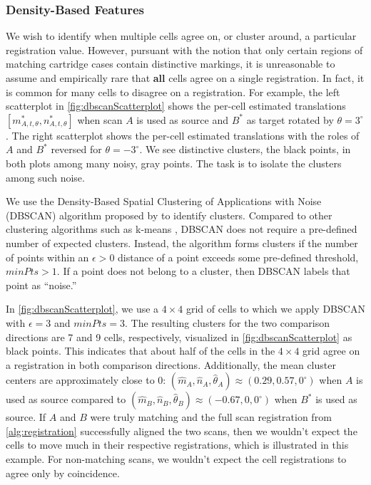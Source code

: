\documentclass[reprint]{JASA}
\begin{document}
\hypertarget{density-based-features}{%
\subsubsection{Density-Based Features}\label{density-based-features}}

We wish to identify when multiple cells agree on, or cluster around, a
particular registration value. However, pursuant with the notion that
only certain regions of matching cartridge cases contain distinctive
markings, it is unreasonable to assume and empirically rare that
\textbf{all} cells agree on a single registration. In fact, it is common
for many cells to disagree on a registration. For example, the left
scatterplot in \autoref{fig:dbscanScatterplot} shows the per-cell
estimated translations \([m^*_{A,t,\theta}, n^*_{A,t,\theta}]\) when
scan \(A\) is used as source and \(B^*\) as target rotated by
\(\theta = 3^\circ\). The right scatterplot shows the per-cell estimated
translations with the roles of \(A\) and \(B^*\) reversed for
\(\theta = -3^\circ\). We see distinctive clusters, the black points, in
both plots among many noisy, gray points. The task is to isolate the
clusters among such noise.

We use the Density-Based Spatial Clustering of Applications with Noise
(DBSCAN) algorithm proposed by \citet{Ester1996} to identify clusters.
Compared to other clustering algorithms such as k-means
\citep{MacQueen1967}, DBSCAN does not require a pre-defined number of
expected clusters. Instead, the algorithm forms clusters if the number
of points within an \(\epsilon > 0\) distance of a point exceeds some
pre-defined threshold, \(minPts > 1\). If a point does not belong to a
cluster, then DBSCAN labels that point as ``noise.''

In \autoref{fig:dbscanScatterplot}, we use a \(4 \times 4\) grid of
cells to which we apply DBSCAN with \(\epsilon = 3\) and \(minPts = 3\).
The resulting clusters for the two comparison directions are 7 and 9
cells, respectively, visualized in \autoref{fig:dbscanScatterplot} as
black points. This indicates that about half of the cells in the
\(4 \times 4\) grid agree on a registration in both comparison
directions. Additionally, the mean cluster centers are approximately
close to 0:
\((\hat{m}_A,\hat{n}_A,\hat{\theta}_A) \approx (0.29, 0.57, 0^\circ)\)
when \(A\) is used as source compared to
\((\hat{m}_B,\hat{n}_B,\hat{\theta}_B) \approx (-0.67, 0, 0^\circ)\)
when \(B^*\) is used as source. If \(A\) and \(B\) were truly matching
and the full scan registration from \autoref{alg:registration}
successfully aligned the two scans, then we wouldn't expect the cells to
move much in their respective registrations, which is illustrated in
this example. For non-matching scans, we wouldn't expect the cell
registrations to agree only by coincidence.
\end{document}
